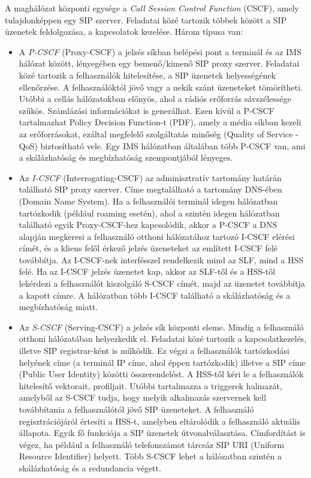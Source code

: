 A maghálózat központi egysége a \emph{Call Session Control Function} (CSCF), amely tulajdonképpen egy SIP szerver. Feladatai közé tartozik többek között a SIP üzenetek feldolgozása, a kapcsolatok kezelése. Három típusa van:
\begin{itemize}
\item A \emph{P-CSCF} (Proxy-CSCF) a jelzés síkban belépési pont a terminál és az IMS hálózat között, lényegében egy bemenő/kimenő SIP proxy szerver. Feladatai közé tartozik a felhasználók hitelesítése, a SIP üzenetek helyességének ellenőrzése. A felhasználóktól jövő vagy a nekik szánt üzeneteket tömörítheti. Utóbbi a cellás hálózatokban előnyös, ahol a rádiós erőforrás sávszélessége szűkös. Számlázási információkat is generálhat. Ezen kívül a P-CSCF tartalmazhat Policy Decision Function-t (PDF), amely a média síkban kezeli az erőforrásokat, ezáltal megfelelő szolgáltatás minőség (Quality of Service - QoS) biztosítható vele. Egy IMS hálózatban általában több P-CSCF van, ami a skálázhatóság és megbízhatóság szempontjából lényeges.
\item Az \emph{I-CSCF} (Interrogating-CSCF) az adminisztratív tartomány határán található SIP proxy szerver. Címe megtalálható a tartomány DNS-ében (Domain Name System). Ha a felhasználói terminál idegen hálózatban tartózkodik (például roaming esetén), ahol a szintén idegen hálózatban található egyik Proxy-CSCF-hez kapcsolódik, akkor a P-CSCF a DNS alapján megkeresi a felhasználó otthoni hálózatához tartozó I-CSCF elérési címét, és a kliens felől érkező jelzés üzeneteket az említett I-CSCF felé továbbítja. Az I-CSCF-nek interfésszel rendelkezik mind az SLF, mind a HSS felé. Ha az I-CSCF jelzés üzenetet kap, akkor az SLF-től és a HSS-től lekérdezi a felhasználót kiszolgáló S-CSCF címét, majd az üzenetet továbbítja a kapott címre. A hálózatban több I-CSCF található a skálázhatóság és a megbízhatóság miatt.
\item Az \emph{S-CSCF} (Serving-CSCF) a jelzés sík központi eleme. Mindig a felhasználó otthoni hálózatában helyezkedik el. Feladatai közé tartozik a kapcsolatkezelés, illetve SIP registrar-ként is működik. Ez végzi a felhasználók tartózkodási helyének címe (a terminál IP címe, ahol éppen tartózkodik) illetve a SIP címe (Public User Identity) közötti összerendelést. A HSS-től kéri le a felhasználók hitelesítő vektorait, profiljait. Utóbbi tartalmazza a triggerek halmazát, amelyből az S-CSCF tudja, hogy melyik alkalmazás szervernek kell továbbítania a felhasználótól jövő SIP üzeneteket. A felhasználó regisztrációjáról értesíti a HSS-t, amelyben eltárolódik a felhasználó aktuális állapota. Egyik fő funkciója a SIP üzenetek útvonalválasztása. Címfordítást is végez, ha például a felhasználó telefonszámot tárcsáz SIP URI (Uniform Resource Identifier) helyett. Több S-CSCF lehet a hálózatban szintén a skálázhatóság és a redundancia végett.
\end{itemize}

